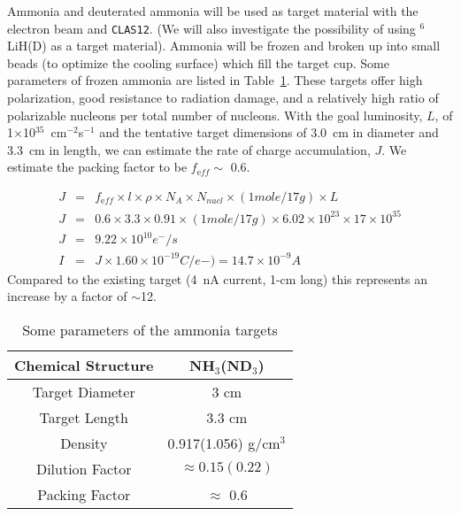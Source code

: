 Ammonia and deuterated ammonia will be used as target material with the 
electron beam and {\tt CLAS12}. (We will also investigate the possibility of 
using $^6$LiH(D) as a target material). Ammonia will be frozen and broken up 
into small beads (to optimize the cooling surface) which fill the target cup.
Some parameters of frozen ammonia are listed in Table~\ref{ammo}.  These 
targets offer high polarization, good resistance to radiation damage, and a 
relatively high ratio of polarizable nucleons per total number of nucleons. 
With the goal luminosity, $L$, of 1$\times$10$^{35}$~cm$^{-2}$s$^{-1}$ and the 
tentative target dimensions of 3.0~cm in diameter and 3.3~cm in length, we can 
estimate the rate of charge accumulation, $J$.  We estimate the packing factor 
to be  $f_{\mathrm eff} \sim$ 0.6.

\begin{eqnarray}
J &=& f_{\mathrm eff}\times l \times \rho \times N_A \times N_{nucl} \times (1 mole/17g) \times L\\ \nonumber
J &=&0.6 \times 3.3 \times 0.91 \times  (1 mole/17g) \times 6.02\times 10^{23} \times 17 \times 10^{35}\\ \nonumber
J &=& 9.22 \times 10^{10} e^-/s\\ \nonumber
I &=& J\times 1.60 \times 10^{-19} C/e-) = 14.7 \times 10^{-9} A
\end{eqnarray}
Compared to the existing target (4~nA current, 1-cm long) this represents an 
increase by a factor of $\sim$12. 

\begin{table}[hbt]
\begin{center}
\begin{tabular}{|cc|} 
\hline
Chemical Structure  & NH$_3$(ND$_3$)   \\
\hline
Target Diameter     & 3 cm \\
\hline
Target Length       & 3.3 cm \\
\hline
Density             & 0.917(1.056) g/cm$^3$  \\
\hline
Dilution Factor     & $\approx 0.15 (0.22)$ \\
\hline
Packing Factor      & $\approx$ 0.6\\
\hline
\end{tabular}
\end{center}
\caption{Some parameters of the ammonia targets}
\label{ammo}
\end{table}

